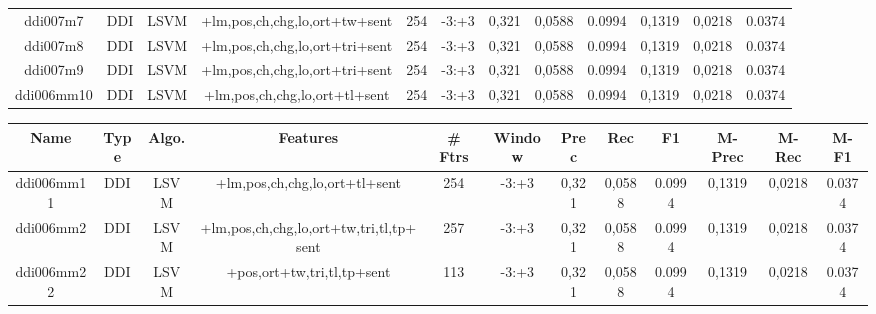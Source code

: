 \documentclass[a4paper]{article}
\begin{document}
\begin{landscape}
\begin{center}
\begin{tabular}{ |c|c|c|c|c|c|c|c|c|c|c|c|}
 
 	
 	\small{ ddi007m7 } & \small{ DDI} & \small{  LSVM }  & +lm,pos,ch,chg,lo,ort+tw+sent  &  254 &  \small{  -3:+3 }  &  0,321 & 0,0588 & 0.0994  &  0,1319 & 0,0218 & 0.0374 \\
 	

 
 	
 	\small{ ddi007m8 } & \small{ DDI} & \small{  LSVM }  & +lm,pos,ch,chg,lo,ort+tri+sent  &  254 &  \small{  -3:+3 }  &  0,321 & 0,0588 & 0.0994  &  0,1319 & 0,0218 & 0.0374 \\
 	

 
 	
 	\small{ ddi007m9 } & \small{ DDI} & \small{  LSVM }  & +lm,pos,ch,chg,lo,ort+tri+sent  &  254 &  \small{  -3:+3 }  &  0,321 & 0,0588 & 0.0994  &  0,1319 & 0,0218 & 0.0374 \\
 	

 
 	
 	\small{ ddi006mm10 } & \small{ DDI} & \small{  LSVM }  & +lm,pos,ch,chg,lo,ort+tl+sent  &  254 &  \small{  -3:+3 }  &  0,321 & 0,0588 & 0.0994  &  0,1319 & 0,0218 & 0.0374 \\
 	
 \hline
\end{tabular}
\end{center}




\begin{center}
\begin{tabular}{ |c|c|c|c|c|c|c|c|c|c|c|c|} 
 \hline
 	Name & Type & Algo. & Features & \# Ftrs & Window & Prec & Rec & F1 & M-Prec & M-Rec & M-F1\\
 \hline

 	

 
 	
 	\small{ ddi006mm11 } & \small{ DDI} & \small{  LSVM }  & +lm,pos,ch,chg,lo,ort+tl+sent  &  254 &  \small{  -3:+3 }  &  0,321 & 0,0588 & 0.0994  &  0,1319 & 0,0218 & 0.0374 \\
 	

 
 	
 	\small{ ddi006mm2 } & \small{ DDI} & \small{  LSVM }  & +lm,pos,ch,chg,lo,ort+tw,tri,tl,tp+sent  &  257 &  \small{  -3:+3 }  &  0,321 & 0,0588 & 0.0994  &  0,1319 & 0,0218 & 0.0374 \\
 	

 
 	
 	\small{ ddi006mm22 } & \small{ DDI} & \small{  LSVM }  & +pos,ort+tw,tri,tl,tp+sent  &  113 &  \small{  -3:+3 }  &  0,321 & 0,0588 & 0.0994  &  0,1319 & 0,0218 & 0.0374 \\
 	


\end{tabular}
\end{center}
\end{landscape}
\end{document}
